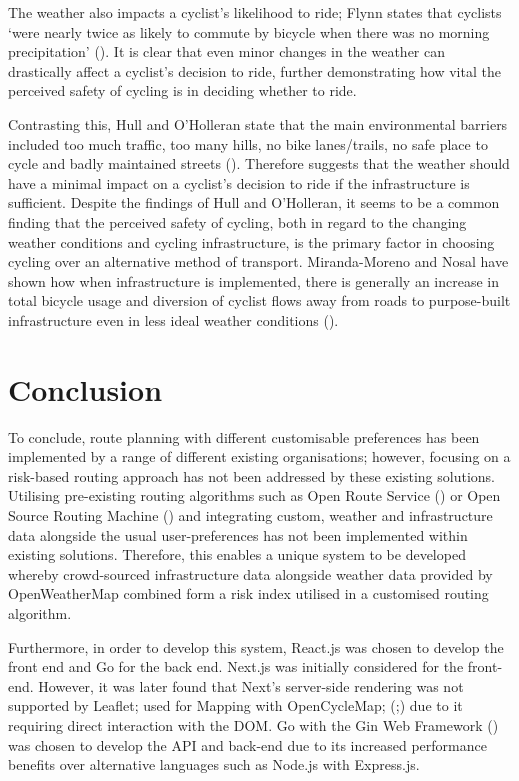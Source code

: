 The weather also impacts a cyclist's likelihood to ride; Flynn states that cyclists `were nearly twice as likely to commute by bicycle when there was no morning precipitation' (\cite{flynn_weather_2012}). It is clear that even minor changes in the weather can drastically affect a cyclist's decision to ride, further demonstrating how vital the perceived safety of cycling is in deciding whether to ride. 

Contrasting this, Hull and O'Holleran state that the main environmental barriers included too much traffic, too many hills, no bike lanes/trails, no safe place to cycle and badly maintained streets (\cite{hull_bicycle_2014}). Therefore suggests that the weather should have a minimal impact on a cyclist's decision to ride if the infrastructure is sufficient. Despite the findings of Hull and O'Holleran, it seems to be a common finding that the perceived safety of cycling, both in regard to the changing weather conditions and cycling infrastructure, is the primary factor in choosing cycling over an alternative method of transport. Miranda-Moreno and Nosal have shown how when infrastructure is implemented, there is generally an increase in total bicycle usage and diversion of cyclist flows away from roads to purpose-built infrastructure even in less ideal weather conditions (\cite{miranda-moreno_weather_2011}).

\section{Conclusion}
\label{litrev:conclusion}

To conclude, route planning with different customisable preferences has been implemented by a range of different existing organisations; however, focusing on a risk-based routing approach has not been addressed by these existing solutions. Utilising pre-existing routing algorithms such as Open Route Service (\cite{noauthor_openrouteservice_nodate}) or Open Source Routing Machine (\cite{noauthor_project_nodate}) and integrating custom, weather and infrastructure data alongside the usual user-preferences has not been implemented within existing solutions. Therefore, this enables a unique system to be developed whereby crowd-sourced infrastructure data alongside weather data provided by OpenWeatherMap combined form a risk index utilised in a customised routing algorithm. %

Furthermore, in order to develop this system, React.js was chosen to develop the front end and Go for the back end. Next.js was initially considered for the front-end. However, it was later found that Next's server-side rendering was not supported by Leaflet; used for Mapping with OpenCycleMap; (\cite{noauthor_leaflet_nodate};\cite{noauthor_opencyclemaporg_nodate}) due to it requiring direct interaction with the DOM. Go with the Gin Web Framework (\cite{noauthor_gin_nodate}) was chosen to develop the API and back-end due to its increased performance benefits over alternative languages such as Node.js with Express.js.